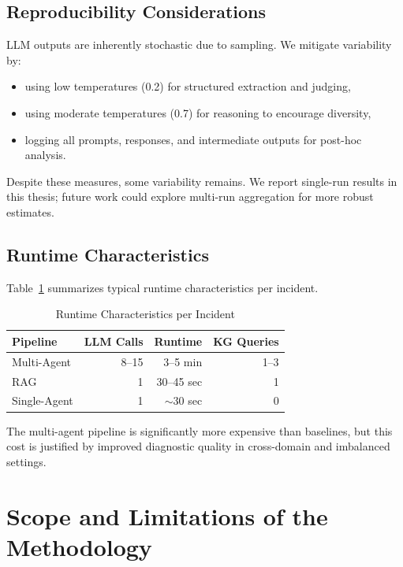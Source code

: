 \subsection{Reproducibility Considerations}
LLM outputs are inherently stochastic due to sampling. We mitigate variability by:
\begin{itemize}
  \item using low temperatures (0.2) for structured extraction and judging,
  \item using moderate temperatures (0.7) for reasoning to encourage diversity,
  \item logging all prompts, responses, and intermediate outputs for post-hoc analysis.
\end{itemize}

Despite these measures, some variability remains. We report single-run results in this thesis;
future work could explore multi-run aggregation for more robust estimates.

\subsection{Runtime Characteristics}
Table~\ref{tab:runtime} summarizes typical runtime characteristics per incident.

\begin{table}[H]
\centering
\caption{Runtime Characteristics per Incident}
\label{tab:runtime}
\begin{tabular}{lrrr}
\toprule
\textbf{Pipeline} & \textbf{LLM Calls} & \textbf{Runtime} & \textbf{KG Queries} \\
\midrule
Multi-Agent  & 8--15 & 3--5 min    & 1--3 \\
RAG          & 1     & 30--45 sec  & 1    \\
Single-Agent & 1     & $\sim$30 sec & 0   \\
\bottomrule
\end{tabular}
\end{table}

The multi-agent pipeline is significantly more expensive than baselines, but this cost is justified
by improved diagnostic quality in cross-domain and imbalanced settings.

\section{Scope and Limitations of the Methodology}

